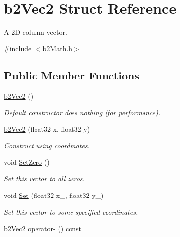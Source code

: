 \hypertarget{structb2_vec2}{}\section{b2\+Vec2 Struct Reference}
\label{structb2_vec2}


A 2D column vector.  




{\ttfamily \#include $<$b2\+Math.\+h$>$}

\subsection*{Public Member Functions}
\begin{DoxyCompactItemize}
\item 
\hyperlink{structb2_vec2_a9171b31deb83af96872f99689939a12f}{b2\+Vec2} ()\hypertarget{structb2_vec2_a9171b31deb83af96872f99689939a12f}{}\label{structb2_vec2_a9171b31deb83af96872f99689939a12f}

\begin{DoxyCompactList}\small\item\em Default constructor does nothing (for performance). \end{DoxyCompactList}\item 
\hyperlink{structb2_vec2_aa8a2f026420a84bbbc62f3a3de2041d6}{b2\+Vec2} (float32 x, float32 y)\hypertarget{structb2_vec2_aa8a2f026420a84bbbc62f3a3de2041d6}{}\label{structb2_vec2_aa8a2f026420a84bbbc62f3a3de2041d6}

\begin{DoxyCompactList}\small\item\em Construct using coordinates. \end{DoxyCompactList}\item 
void \hyperlink{structb2_vec2_a5c6cbe27cfb29c6dbb29b9a3285b88d0}{Set\+Zero} ()\hypertarget{structb2_vec2_a5c6cbe27cfb29c6dbb29b9a3285b88d0}{}\label{structb2_vec2_a5c6cbe27cfb29c6dbb29b9a3285b88d0}

\begin{DoxyCompactList}\small\item\em Set this vector to all zeros. \end{DoxyCompactList}\item 
void \hyperlink{structb2_vec2_a4d61640a645e470a50b451307d8e94c3}{Set} (float32 x\+\_\+, float32 y\+\_\+)\hypertarget{structb2_vec2_a4d61640a645e470a50b451307d8e94c3}{}\label{structb2_vec2_a4d61640a645e470a50b451307d8e94c3}

\begin{DoxyCompactList}\small\item\em Set this vector to some specified coordinates. \end{DoxyCompactList}\item 
\hyperlink{structb2_vec2}{b2\+Vec2} \hyperlink{structb2_vec2_ab1f648091d3cba00b4c132758fcf4450}{operator-\/} () const \hypertarget{structb2_vec2_ab1f648091d3cba00b4c132758fcf4450}{}\label{structb2_vec2_ab1f648091d3cba00b4c132758fcf4450}


\end{DoxyCompactItemize}

